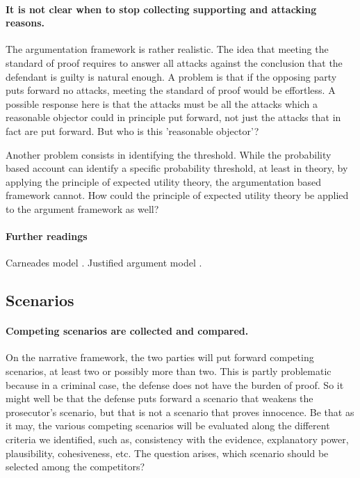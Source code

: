 \documentclass[10pt]{article}
\begin{document}
\paragraph{It is not clear when to stop collecting supporting and attacking reasons.}


The argumentation framework is rather realistic. The idea that meeting the standard of proof requires to answer all 
attacks against the conclusion that the defendant is guilty 
is natural enough. A problem is that if the opposing party puts forward no attacks, meeting the standard of proof would be effortless. 
A possible response here is that the attacks must be all the attacks which a reasonable objector could in principle put forward, not just 
the attacks that in fact are put forward. %
But who is this 'reasonable objector'?

Another problem consists in identifying the threshold. While the probability based account can identify a specific probability threshold, 
at least in theory, by applying the principle of expected utility theory, the argumentation based framework cannot. 
How could the principle of expected utility theory be applied to the argument framework as well?



\paragraph{Further readings}
Carneades model \citep{gordonEtal2007, gordon2009}.
Justified argument model \citep{prakkenSartor2007, prakken2009}.



\subsection{Scenarios}


\paragraph{Competing scenarios are collected and compared.}

On the narrative framework, the two parties will put forward competing scenarios, at least two or possibly more than two. This is partly problematic because in a criminal case, the defense does not have the burden of proof. So it might well be that the defense puts forward a scenario that weakens the prosecutor's scenario, but that is not 
a scenario that proves innocence. Be that as it may, the various competing scenarios will be evaluated along the different criteria we identified, such as, consistency with the evidence, explanatory power, plausibility, cohesiveness, etc. The question arises, which scenario should be selected among the competitors?
\end{document}
